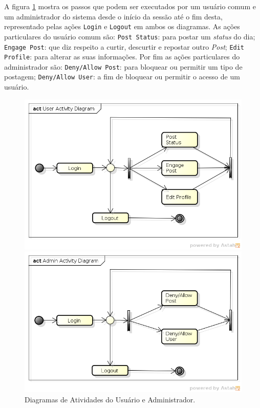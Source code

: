 \documentclass[12pt]{article}
\begin{document}
A figura \ref{fig:activity} mostra os passos que podem ser executados por um usuário comum e um administrador do sistema desde o início da sessão até o fim desta, representado pelas ações \texttt{Login} e \texttt{Logout} em ambos os diagramas. As ações particulares do usuário comum são: \texttt{Post Status}: para postar um \textit{status} do dia; \texttt{Engage Post}: que diz respeito a curtir, descurtir e repostar outro \textit{Post}; \texttt{Edit Profile}: para alterar as suas informações. Por fim as ações particulares do administrador são: \texttt{Deny/Allow Post}: para bloquear ou permitir um tipo de postagem; \texttt{Deny/Allow User}: a fim de bloquear ou permitir o acesso de um usuário.

\begin{figure}[ht]
    \begin{minipage}{.5\textwidth}
        \includegraphics[width=1\textwidth]{assets/img/user-activity-diagram.png}
    \end{minipage}
    \begin{minipage}{.5\textwidth}
        \includegraphics[width=1.1\textwidth]{assets/img/admin-activity-diagram.png}
    \end{minipage}
\label{fig:activity}
\caption{Diagramas de Atividades do Usuário e Administrador.}
\end{figure}
\end{document}

